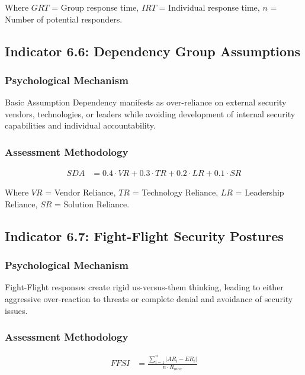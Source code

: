\documentclass[11pt,a4paper]{article}
\begin{document}
Where $GRT$ = Group response time, $IRT$ = Individual response time, $n$ = Number of potential responders.

\subsection{Indicator 6.6: Dependency Group Assumptions}

\subsubsection{Psychological Mechanism}

Basic Assumption Dependency manifests as over-reliance on external security vendors, technologies, or leaders while avoiding development of internal security capabilities and individual accountability.

\subsubsection{Assessment Methodology}

\begin{align}
SDA &= 0.4 \cdot VR + 0.3 \cdot TR + 0.2 \cdot LR + 0.1 \cdot SR
\end{align}

Where $VR$ = Vendor Reliance, $TR$ = Technology Reliance, $LR$ = Leadership Reliance, $SR$ = Solution Reliance.

\subsection{Indicator 6.7: Fight-Flight Security Postures}

\subsubsection{Psychological Mechanism}

Fight-Flight responses create rigid us-versus-them thinking, leading to either aggressive over-reaction to threats or complete denial and avoidance of security issues.

\subsubsection{Assessment Methodology}

\begin{align}
FFSI &= \frac{\sum_{i=1}^{n} |AR_i - ER_i|}{n \cdot R_{max}}
\end{align}
\end{document}
